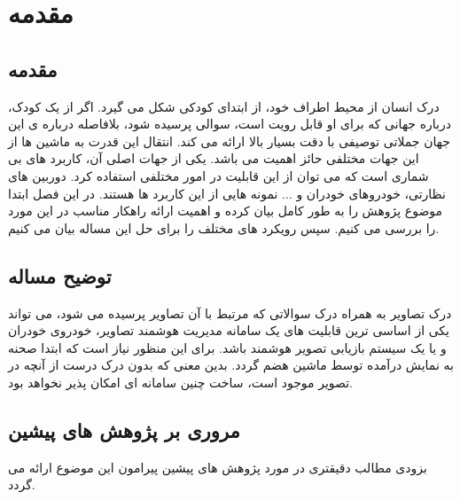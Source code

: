 \chapter{مقدمه}

\section{مقدمه}
درک انسان از محیط اطراف خود، از ابتدای کودکی شکل می گیرد. اگر از یک کودک، درباره جهانی که برای او قابل رویت است، سوالی پرسیده شود، بلافاصله درباره ی این جهان جملاتی توصیفی با دقت بسیار بالا ارائه می کند. انتقال این قدرت به ماشین ها از این جهات مختلفی حائز اهمیت می باشد. یکی از جهات اصلی آن، کاربرد های بی شماری است که می توان از این قابلیت در امور مختلفی استفاده کرد. دوربین های نظارتی، خودروهای خودران و ... نمونه هایی از این کاربرد ها هستند. در این فصل ابتدا موضوع پژوهش را به طور کامل بیان کرده و اهمیت ارائه راهکار مناسب در این مورد را بررسی می کنیم.
سپس رویکرد های مختلف را برای حل این مساله بیان می کنیم.
\section{توضیح مساله}\label{sec2}
درک تصاویر به همراه درک سوالاتی که مرتبط با آن تصاویر پرسیده می شود، می تواند یکی از اساسی ترین قابلیت های یک سامانه مدیریت هوشمند تصاویر، خودروی خودران و یا یک سیستم بازیابی تصویر هوشمند باشد.
برای این منظور نیاز است که ابتدا صحنه به نمایش درآمده توسط ماشین هضم گردد. بدین معنی که بدون درک درست از آنچه در تصویر موجود است، ساخت چنین سامانه ای امکان پذیر نخواهد بود. 

\section{مروری بر پژوهش های پیشین}

بزودی مطالب دقیقتری در مورد پژوهش های پیشین پیرامون این موضوع ارائه می گردد.